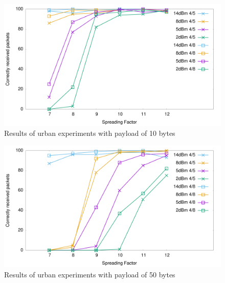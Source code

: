 \begin{figure}[]
\centering
\includegraphics[width=\textwidth]{img/test/urban/len0}
\caption{Results of urban experiments with payload of 10 bytes}
\label{fig:len10urban}
\end{figure}

\begin{figure}[]
\centering
\includegraphics[width=\textwidth]{img/test/urban/len1}
\caption{Results of urban experiments with payload of 50 bytes}
\label{fig:len50urban}
\end{figure}







